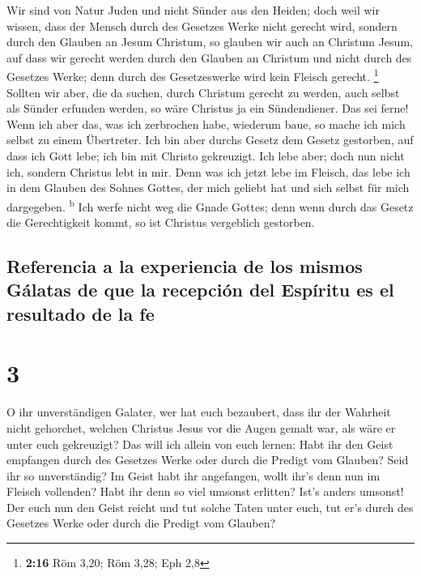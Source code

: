  Wir sind von Natur Juden und nicht Sünder aus den
Heiden;  doch weil wir wissen, dass der Mensch durch des
Gesetzes Werke nicht gerecht wird, sondern durch den Glauben an Jesum
Christum, so glauben wir auch an Christum Jesum, auf dass wir gerecht
werden durch den Glauben an Christum und nicht durch des Gesetzes Werke;
denn durch des Gesetzeswerke wird kein Fleisch gerecht. \footnote{\textbf{2:16}
  Röm 3,20; Röm 3,28; Eph 2,8}  Sollten wir aber, die da
suchen, durch Christum gerecht zu werden, auch selbst als Sünder
erfunden werden, so wäre Christus ja ein Sündendiener. Das sei ferne!
 Wenn ich aber das, was ich zerbrochen habe, wiederum
baue, so mache ich mich selbst zu einem Übertreter.  Ich
bin aber durchs Gesetz dem Gesetz gestorben, auf dass ich Gott lebe; ich
bin mit Christo gekreuzigt.  Ich lebe aber; doch nun
nicht ich, sondern Christus lebt in mir. Denn was ich jetzt lebe im
Fleisch, das lebe ich in dem Glauben des Sohnes Gottes, der mich geliebt
hat und sich selbst für mich dargegeben. \textsuperscript{b}
 Ich werfe nicht weg die Gnade Gottes; denn wenn durch
das Gesetz die Gerechtigkeit kommt, so ist Christus vergeblich
gestorben.

\hypertarget{referencia-a-la-experiencia-de-los-mismos-guxe1latas-de-que-la-recepciuxf3n-del-espuxedritu-es-el-resultado-de-la-fe}{%
\subsection{Referencia a la experiencia de los mismos Gálatas de que la
recepción del Espíritu es el resultado de la
fe}\label{referencia-a-la-experiencia-de-los-mismos-guxe1latas-de-que-la-recepciuxf3n-del-espuxedritu-es-el-resultado-de-la-fe}}

\hypertarget{section-2}{%
\section{3}\label{section-2}}

 O ihr unverständigen Galater, wer hat euch bezaubert,
dass ihr der Wahrheit nicht gehorchet, welchen Christus Jesus vor die
Augen gemalt war, als wäre er unter euch gekreuzigt?  Das
will ich allein von euch lernen: Habt ihr den Geist empfangen durch des
Gesetzes Werke oder durch die Predigt vom Glauben?  Seid
ihr so unverständig? Im Geist habt ihr angefangen, wollt ihr's denn nun
im Fleisch vollenden?  Habt ihr denn so viel umsonst
erlitten? Ist's anders umsonst!  Der euch nun den Geist
reicht und tut solche Taten unter euch, tut er's durch des Gesetzes
Werke oder durch die Predigt vom Glauben?

